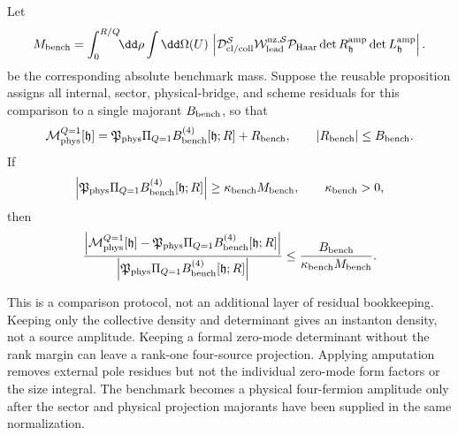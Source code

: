 \begin{controlledapproximation}
Let
\[
  M_{\rm bench}
  =
  \int_{0}^{R/Q}\!\!\dd\rho\int\dd\Omega(U)\,
  \left|
  \mathcal D_{\rm cl/coll}^{\mathcal S}
  \mathcal W_{\rm lead}^{\rm nz,\mathcal S}
  \mathcal P_{\rm Haar}
  \det R_{\mathfrak h}^{\rm amp}
  \det L_{\mathfrak h}^{\rm amp}
  \right|.
\]
be the corresponding absolute benchmark mass.  Suppose the reusable proposition
assigns all internal, sector, physical-bridge, and scheme residuals for this
comparison to a single majorant \(B_{\rm bench}\), so that
\[
  \mathcal M_{\rm phys}^{Q=1}[\mathfrak h]
  =
  \mathfrak P_{\rm phys}\Pi_{Q=1}
  B_{\rm bench}^{(4)}[\mathfrak h;R]
  +
  R_{\rm bench},
  \qquad
  |R_{\rm bench}|\le B_{\rm bench}.
\]
If
\[
  \left|
  \mathfrak P_{\rm phys}\Pi_{Q=1}
  B_{\rm bench}^{(4)}[\mathfrak h;R]
  \right|
  \ge\kappa_{\rm bench}M_{\rm bench},
  \qquad \kappa_{\rm bench}>0,
\]
then
\begin{equation}
  \frac{
  \left|
    \mathcal M_{\rm phys}^{Q=1}[\mathfrak h]
    -
    \mathfrak P_{\rm phys}\Pi_{Q=1}
    B_{\rm bench}^{(4)}[\mathfrak h;R]
  \right|}
  {
  \left|
    \mathfrak P_{\rm phys}\Pi_{Q=1}
    B_{\rm bench}^{(4)}[\mathfrak h;R]
  \right|}
  \le
  \frac{B_{\rm bench}}{\kappa_{\rm bench}M_{\rm bench}} .
  \label{eq:thooft-benchmark-relative-bound}
\end{equation}

This is a comparison protocol, not an additional layer of residual
bookkeeping.  Keeping only the collective density and determinant gives an
instanton density, not a source amplitude.  Keeping a formal zero-mode
determinant without the rank margin can leave a rank-one four-source
projection.  Applying amputation removes external pole residues but not the
individual zero-mode form factors or the size integral.  The benchmark becomes
a physical four-fermion amplitude only after the sector and physical projection
majorants have been supplied in the same normalization.
\end{controlledapproximation}

